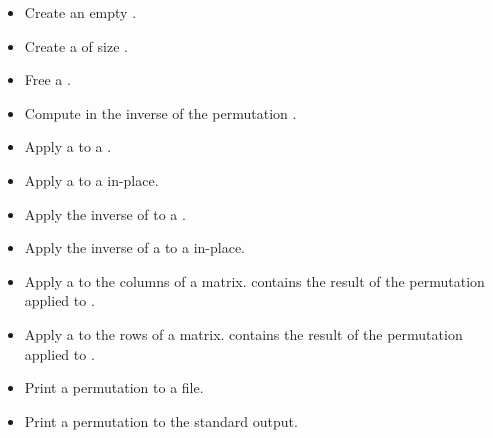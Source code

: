 \begin{itemize}
  \item {}
    \sshortdescribe Create an empty \PnlPermutation.  

\item {}
  \sshortdescribe Create a \PnlPermutation of size .  

\item {}
  \sshortdescribe Free a \PnlPermutation.

\item {}
  \sshortdescribe Compute in  the inverse of the permutation .
\item {} 
  \sshortdescribe Apply a \PnlPermutation to a \PnlVect.  

\item {} 
  \sshortdescribe Apply a \PnlPermutation to a
  \PnlVect in-place.  

\item {} 
  \sshortdescribe Apply the inverse of \PnlPermutation to a \PnlVect.  

\item {} 
  \sshortdescribe Apply the inverse of a \PnlPermutation to a
  \PnlVect in-place.  

\item {}
  \sshortdescribe Apply a \PnlPermutation to the columns of a
  matrix.  contains the result of the permutation applied to . 
\item {}
  \sshortdescribe Apply a \PnlPermutation to the rows of a
  matrix.  contains the result of the permutation applied to . 
  
\item {}
  \sshortdescribe Print a permutation to a file.  

\item {}
  \sshortdescribe Print a permutation to the standard output.  
\end{itemize}


